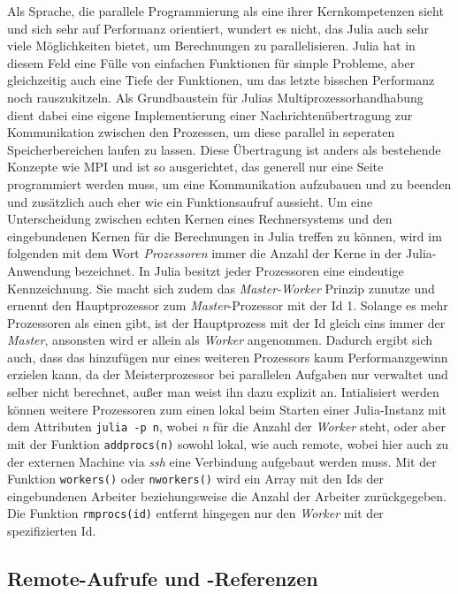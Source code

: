 \documentclass[proseminar,german,utf8]{zihpub}
\begin{document}
Als Sprache, die parallele Programmierung als eine ihrer Kernkompetenzen sieht und sich sehr auf Performanz orientiert, wundert es nicht, das Julia auch sehr viele Möglichkeiten bietet, um Berechnungen zu parallelisieren. Julia hat in diesem Feld eine Fülle von einfachen Funktionen für simple Probleme, aber gleichzeitig auch eine Tiefe der Funktionen, um das letzte bisschen Performanz noch rauszukitzeln. Als Grundbaustein für Julias Multiprozessorhandhabung dient dabei eine eigene Implementierung einer Nachrichtenübertragung zur Kommunikation zwischen den Prozessen, um diese parallel in seperaten Speicherbereichen laufen zu lassen. Diese Übertragung ist anders als bestehende Konzepte wie MPI und ist so ausgerichtet, das generell nur eine Seite programmiert werden muss, um eine Kommunikation aufzubauen und zu beenden und zusätzlich auch eher wie ein Funktionsaufruf aussieht. Um eine Unterscheidung zwischen echten Kernen eines Rechnersystems und den eingebundenen Kernen für die Berechnungen in Julia treffen zu können, wird im folgenden mit dem Wort \textit{Prozessoren} immer die Anzahl der Kerne in der Julia-Anwendung bezeichnet. In Julia besitzt jeder Prozessoren eine eindeutige Kennzeichnung. Sie macht sich zudem das \textit{Master-Worker} Prinzip zunutze und ernennt den Hauptprozessor zum \textit{Master}-Prozessor mit der Id 1. Solange es mehr Prozessoren als einen gibt, ist der Hauptprozess mit der Id gleich eins immer der \textit{Master}, ansonsten wird er allein als \textit{Worker} angenommen. Dadurch ergibt sich auch, dass das hinzufügen nur eines weiteren Prozessors kaum Performanzgewinn erzielen kann, da der Meisterprozessor bei parallelen Aufgaben nur verwaltet und selber nicht berechnet, außer man weist ihn dazu explizit an. Intialisiert werden können weitere Prozessoren zum einen lokal beim Starten einer Julia-Instanz mit dem Attributen \verb|julia -p n|, wobei \textit{n} für die Anzahl der \textit{Worker} steht, oder aber mit der Funktion \verb|addprocs(n)| sowohl lokal, wie auch remote, wobei hier auch zu der externen Machine via \textit{ssh} eine Verbindung aufgebaut werden muss. Mit der Funktion \verb|workers()| oder \verb|nworkers()| wird ein Array mit den Ids der eingebundenen Arbeiter beziehungsweise die Anzahl der Arbeiter zurückgegeben. Die Funktion \verb|rmprocs(id)| entfernt hingegen nur den \textit{Worker} mit der spezifizierten Id.~\cite{JuliaLangDocumentation}~\cite{JuliaCookbook}

\subsection{Remote-Aufrufe und -Referenzen}
\end{document}
